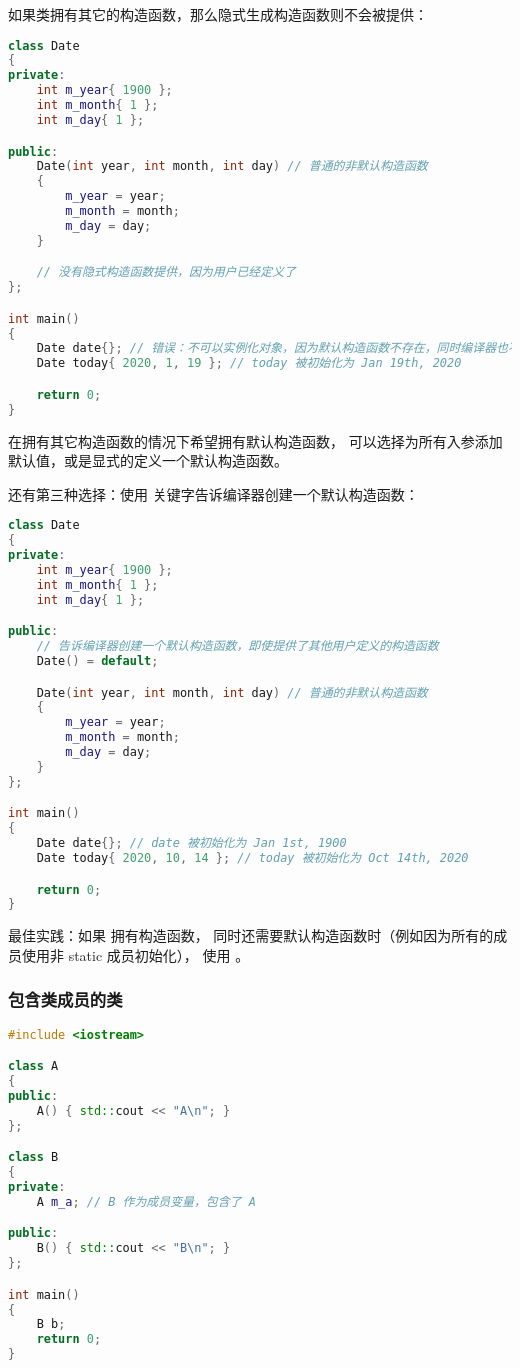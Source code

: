 \documentclass[../../LearnCpp.tex]{subfiles}
\begin{document}
如果类拥有其它的构造函数，那么隐式生成构造函数则不会被提供：

\begin{lstlisting}[language=C++]
class Date
{
private:
    int m_year{ 1900 };
    int m_month{ 1 };
    int m_day{ 1 };

public:
    Date(int year, int month, int day) // 普通的非默认构造函数
    {
        m_year = year;
        m_month = month;
        m_day = day;
    }

    // 没有隐式构造函数提供，因为用户已经定义了
};

int main()
{
    Date date{}; // 错误：不可以实例化对象，因为默认构造函数不存在，同时编译器也不会生成它
    Date today{ 2020, 1, 19 }; // today 被初始化为 Jan 19th, 2020

    return 0;
}
\end{lstlisting}

在拥有其它构造函数的情况下希望拥有默认构造函数，
可以选择为所有入参添加默认值，或是显式的定义一个默认构造函数。

还有第三种选择：使用  关键字告诉编译器创建一个默认构造函数：

\begin{lstlisting}[language=C++]
class Date
{
private:
    int m_year{ 1900 };
    int m_month{ 1 };
    int m_day{ 1 };

public:
    // 告诉编译器创建一个默认构造函数，即使提供了其他用户定义的构造函数
    Date() = default;

    Date(int year, int month, int day) // 普通的非默认构造函数
    {
        m_year = year;
        m_month = month;
        m_day = day;
    }
};

int main()
{
    Date date{}; // date 被初始化为 Jan 1st, 1900
    Date today{ 2020, 10, 14 }; // today 被初始化为 Oct 14th, 2020

    return 0;
}
\end{lstlisting}

最佳实践：如果  拥有构造函数，
同时还需要默认构造函数时（例如因为所有的成员使用非 static 成员初始化），
使用 。

\subsubsection*{包含类成员的类}

\begin{lstlisting}[language=C++]
#include <iostream>

class A
{
public:
    A() { std::cout << "A\n"; }
};

class B
{
private:
    A m_a; // B 作为成员变量，包含了 A

public:
    B() { std::cout << "B\n"; }
};

int main()
{
    B b;
    return 0;
}
\end{lstlisting}
\end{document}
